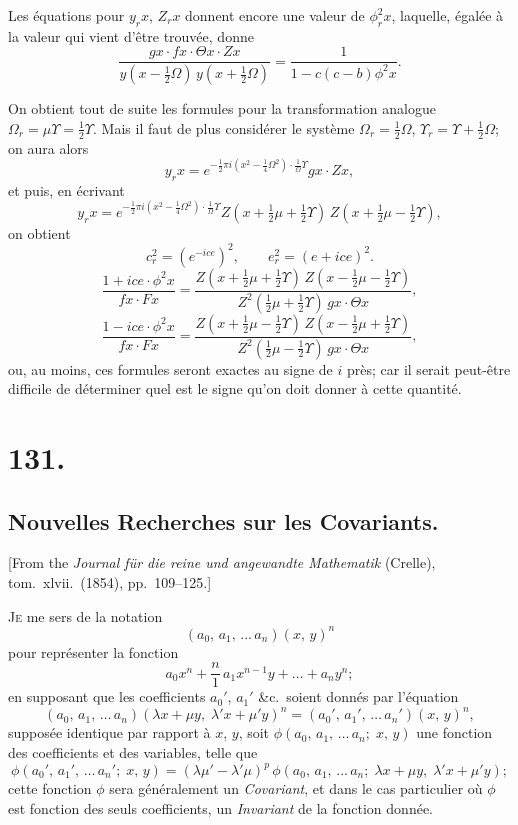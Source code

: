\documentclass[11pt,a4paper]{book}
\begin{document}
Les \'equations pour $y_r x$, $Z_r x$ donnent encore une valeur de
$\phi_r^2 x$, laquelle, \'egal\'ee \`a la valeur qui vient d'\^etre trouv\'ee,
donne
\[
\frac{gx \cdot fx \cdot \Theta x \cdot Zx}{y(x-\tfrac{1}{2}\Omega)\,y(x+\tfrac{1}{2}\Omega)}
= \frac{1}{1-c(c-b)\phi^2 x}.
\]

On obtient tout de suite les formules pour la transformation analogue
$\Omega_r = \mu\Upsilon = \tfrac{1}{2}\Upsilon$. Mais il faut de plus consid\'erer
le syst\`eme $\Omega_r = \tfrac{1}{2}\Omega$, $\Upsilon_r = \Upsilon + \tfrac{1}{2}\Omega$;
on aura alors
\[
y_r x = e^{-\frac{1}{2}\pi i(x^2 - \tfrac{1}{4}\Omega^2)\cdot\tfrac{1}{\Omega}\Upsilon}
gx\cdot Zx,
\]
et puis, en \'ecrivant
\[
y_r x = e^{-\frac{1}{2}\pi i(x^2 - \tfrac{1}{4}\Omega^2)\cdot\tfrac{1}{\Omega}\Upsilon}
Z(x+\tfrac{1}{2}\mu+\tfrac{1}{2}\Upsilon)\,Z(x+\tfrac{1}{2}\mu-\tfrac{1}{2}\Upsilon),
\]
on obtient
\[
c_r^2 = (e^{-ice})^2,\qquad e_r^2 = (e+ice)^2.
\]
\[
\frac{1+ice\cdot\phi^2 x}{fx \cdot Fx}
= \frac{Z(x+\tfrac{1}{2}\mu+\tfrac{1}{2}\Upsilon)\,Z(x-\tfrac{1}{2}\mu-\tfrac{1}{2}\Upsilon)}
{Z^2(\tfrac{1}{2}\mu+\tfrac{1}{2}\Upsilon)\,gx\cdot\Theta x},
\]
\[
\frac{1-ice\cdot\phi^2 x}{fx \cdot Fx}
= \frac{Z(x+\tfrac{1}{2}\mu-\tfrac{1}{2}\Upsilon)\,Z(x-\tfrac{1}{2}\mu+\tfrac{1}{2}\Upsilon)}
{Z^2(\tfrac{1}{2}\mu-\tfrac{1}{2}\Upsilon)\,gx\cdot\Theta x},
\]
ou, au moins, ces formules seront exactes au signe de $i$ pr\`es; car il
serait peut-\^etre difficile de d\'eterminer quel est le signe qu'on doit
donner \`a cette quantit\'e.

\newpage
\section*{131.}
\subsection*{Nouvelles Recherches sur les Covariants.}

[From the \textit{Journal f\"ur die reine und angewandte Mathematik} (Crelle),
tom.\ xlvii.\ (1854), pp.\ 109--125.]

\medskip

\textsc{Je} me sers de la notation
\[
(a_0,\, a_1,\, \ldots\, a_n)(x,\, y)^n
\]
pour repr\'esenter la fonction
\[
a_0 x^n + \frac{n}{1}\,a_1 x^{n-1}y + \ldots + a_n y^n;
\]
en supposant que les coefficients $a_0'$, $a_1'$ \&c.\ soient donn\'es par
l'\'equation
\[
(a_0,\, a_1,\, \ldots\, a_n)(\lambda x + \mu y,\; \lambda' x + \mu' y)^n
= (a_0',\, a_1',\, \ldots\, a_n')(x,\, y)^n,
\]
suppos\'ee identique par rapport \`a $x$, $y$, soit
$\phi(a_0,\, a_1,\, \ldots\, a_n;\; x,\, y)$ une fonction des coefficients et
des variables, telle que
\[
\phi(a_0',\, a_1',\, \ldots\, a_n';\; x,\, y)
= (\lambda\mu' - \lambda'\mu)^p\,
\phi(a_0,\, a_1,\, \ldots\, a_n;\; \lambda x + \mu y,\; \lambda' x + \mu' y);
\]
cette fonction $\phi$ sera g\'en\'eralement un \textit{Covariant}, et dans le
cas particulier o\`u $\phi$ est fonction des seuls coefficients, un
\textit{Invariant} de la fonction donn\'ee.
\end{document}
